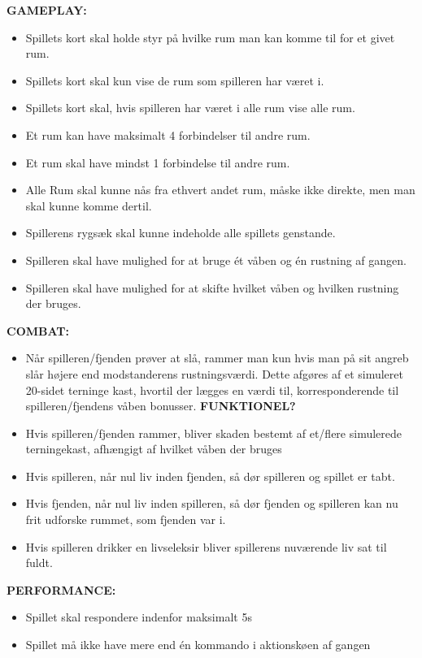 \textbf{GAMEPLAY:}
\begin{itemize}
\item Spillets kort skal holde styr på hvilke rum man kan komme til for et givet rum.
\item Spillets kort skal kun vise de rum som spilleren har været i.
\item Spillets kort skal, hvis spilleren har været i alle rum vise alle rum.
\item Et rum kan have maksimalt 4 forbindelser til andre rum.
\item Et rum skal have mindst 1 forbindelse til andre rum.
\item Alle Rum skal kunne nås fra ethvert andet rum, måske ikke direkte, men man skal kunne komme dertil.
\item Spillerens rygsæk skal kunne indeholde alle spillets genstande.
\item Spilleren skal have mulighed for at bruge ét våben og én rustning af gangen.
\item Spilleren skal have mulighed for at skifte hvilket våben og hvilken rustning der bruges.

\end{itemize}
    
\textbf{COMBAT:}

\begin{itemize}
\item Når spilleren/fjenden prøver at slå, rammer man kun hvis man på sit angreb slår højere end modstanderens rustningsværdi. Dette afgøres af et simuleret 20-sidet terninge kast, hvortil der lægges en værdi til, korresponderende til spilleren/fjendens våben bonusser. \textbf{FUNKTIONEL?}
\item Hvis spilleren/fjenden rammer, bliver skaden bestemt af et/flere simulerede terningekast, afhængigt af hvilket våben der bruges
\item Hvis spilleren, når nul liv inden fjenden, så dør spilleren og spillet er tabt.
\item Hvis fjenden, når nul liv inden spilleren, så dør fjenden og spilleren kan nu frit udforske rummet, som fjenden var i.
\item Hvis spilleren drikker en livseleksir bliver spillerens nuværende liv sat til fuldt.
\end{itemize}

\textbf{PERFORMANCE:}    

\begin{itemize}
\item Spillet skal respondere indenfor maksimalt 5s
\item Spillet må ikke have mere end én kommando i aktionskøen af gangen
\end{itemize}

